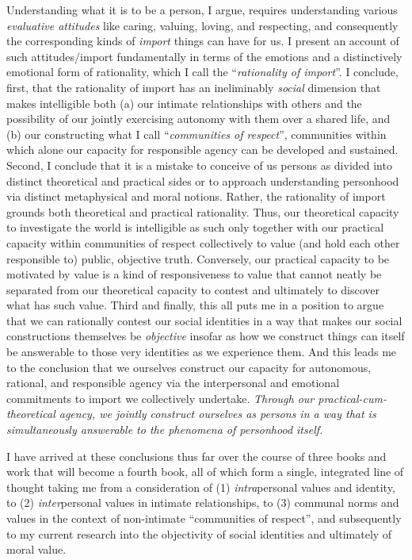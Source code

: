 \documentclass[11pt]{article}
\begin{document}
Understanding what it is to be a person, I argue, requires understanding various \emph{evaluative attitudes} like caring, valuing, loving, and respecting, and consequently the corresponding kinds of \emph{import} things can have for us. I present an account of such attitudes\slash import fundamentally in terms of the emotions and a distinctively emotional form of rationality, which I call the \enquote{\emph{rationality of import}}. I conclude, first, that the rationality of import has an ineliminably \emph{social} dimension that makes intelligible both (a) our intimate relationships with others and the possibility of our jointly exercising autonomy with them over a shared life, and (b) our constructing what I call \enquote{\emph{communities of respect}}, communities within which alone our capacity for responsible agency can be developed and sustained. Second, I conclude that it is a mistake to conceive of us persons as divided into distinct theoretical and practical sides or to approach understanding personhood via distinct metaphysical and moral notions. Rather, the rationality of import grounds both theoretical and practical rationality. Thus, our theoretical capacity to investigate the world is intelligible as such only together with our practical capacity within communities of respect collectively to value (and hold each other responsible to) public, objective truth. Conversely, our practical capacity to be motivated by value is a kind of responsiveness to value that cannot neatly be separated from our theoretical capacity to contest and ultimately to discover what has such value. Third and finally, this all puts me in a position to argue that we can rationally contest our social identities in a way that makes our social constructions themselves be \emph{objective} insofar as how we construct things can itself be answerable to those very identities as we experience them. And this leads me to the conclusion that we ourselves construct our capacity for autonomous, rational, and responsible agency via the interpersonal and emotional commitments to import we collectively undertake. \emph{Through our practical-cum-theoretical agency, we jointly construct ourselves as persons in a way that is simultaneously answerable to the phenomena of personhood itself.}

I have arrived at these conclusions thus far over the course of three books and work that will become a fourth book, all of which form a single, integrated line of thought taking me from a consideration of (1) \emph{intra}personal values and identity, to (2) \emph{inter}personal values in intimate relationships, to (3) communal norms and values in the context of non-intimate \enquote{communities of respect}, and subsequently to my current research into the objectivity of social identities and ultimately of moral value.
\end{document}

